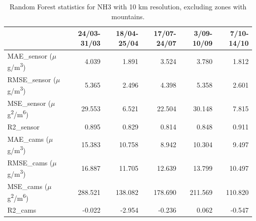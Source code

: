 \begin{table}[H]
\begin{tabular}{lrrrrr}
\toprule
 &  24/03-31/03 &  18/04-25/04 &  17/07-24/07 &  3/09-10/09 &  7/10-14/10 \\
\midrule
 MAE\_sensor ($\mu$g/m\textsuperscript{3})&        4.039 &        1.891 &        3.524 &       3.780 &       1.812 \\
RMSE\_sensor ($\mu$g/m\textsuperscript{3})&        5.365 &        2.496 &        4.398 &       5.358 &       2.601 \\
 MSE\_sensor ($\mu$g\textsuperscript{2}/m\textsuperscript{6})&       29.553 &        6.521 &       22.504 &      30.148 &       7.815 \\
  R2\_sensor &        0.895 &        0.829 &        0.814 &       0.848 &       0.911 \\
   MAE\_cams ($\mu$g/m\textsuperscript{3})&       15.383 &       10.758 &        8.942 &      10.304 &       9.497 \\
  RMSE\_cams ($\mu$g/m\textsuperscript{3})&       16.887 &       11.705 &       12.639 &      13.799 &      10.497 \\
   MSE\_cams ($\mu$g\textsuperscript{2}/m\textsuperscript{6})&      288.521 &      138.082 &      178.690 &     211.569 &     110.820 \\
    R2\_cams &       -0.022 &       -2.954 &       -0.236 &       0.062 &      -0.547 \\
\bottomrule
\end{tabular}
\caption{Random Forest statistics for NH3 with 10 km resolution, excluding zones with mountains.}
\end{table}

